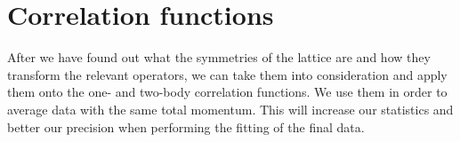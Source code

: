 
  
\section{Correlation functions}

After we have found out what the symmetries of the lattice are and how they transform the relevant operators, we can take them into consideration and apply them onto the one- and two-body correlation functions. We use them in order to average data with the same total momentum. This will increase our statistics and better our precision when performing the fitting of the final data.

